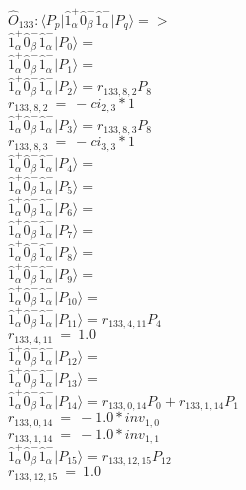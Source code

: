\documentclass[14pt]{article}
\begin{document}
    $\hat{O}_{133}:  \langle{P_p}\vert \hat{1}_{\alpha}^{+}\hat{0}_{\beta}^{-}\hat{1}_{\alpha}^{-} \vert{P_q}\rangle => $ \\ 
    $ \hat{1}_{\alpha}^{+}\hat{0}_{\beta}^{-}\hat{1}_{\alpha}^{-} \vert{P_{0}}\rangle =  $ \\ 
    $ \hat{1}_{\alpha}^{+}\hat{0}_{\beta}^{-}\hat{1}_{\alpha}^{-} \vert{P_{1}}\rangle =  $ \\ 
    $ \hat{1}_{\alpha}^{+}\hat{0}_{\beta}^{-}\hat{1}_{\alpha}^{-} \vert{P_{2}}\rangle = {r}_{133,8,2}P_{8} $ \\ 
    ${r}_{133,8,2}\ =\ -{ci}_{2,3}*1 $ \\ 
    $ \hat{1}_{\alpha}^{+}\hat{0}_{\beta}^{-}\hat{1}_{\alpha}^{-} \vert{P_{3}}\rangle = {r}_{133,8,3}P_{8} $ \\ 
    ${r}_{133,8,3}\ =\ -{ci}_{3,3}*1 $ \\ 
    $ \hat{1}_{\alpha}^{+}\hat{0}_{\beta}^{-}\hat{1}_{\alpha}^{-} \vert{P_{4}}\rangle =  $ \\ 
    $ \hat{1}_{\alpha}^{+}\hat{0}_{\beta}^{-}\hat{1}_{\alpha}^{-} \vert{P_{5}}\rangle =  $ \\ 
    $ \hat{1}_{\alpha}^{+}\hat{0}_{\beta}^{-}\hat{1}_{\alpha}^{-} \vert{P_{6}}\rangle =  $ \\ 
    $ \hat{1}_{\alpha}^{+}\hat{0}_{\beta}^{-}\hat{1}_{\alpha}^{-} \vert{P_{7}}\rangle =  $ \\ 
    $ \hat{1}_{\alpha}^{+}\hat{0}_{\beta}^{-}\hat{1}_{\alpha}^{-} \vert{P_{8}}\rangle =  $ \\ 
    $ \hat{1}_{\alpha}^{+}\hat{0}_{\beta}^{-}\hat{1}_{\alpha}^{-} \vert{P_{9}}\rangle =  $ \\ 
    $ \hat{1}_{\alpha}^{+}\hat{0}_{\beta}^{-}\hat{1}_{\alpha}^{-} \vert{P_{10}}\rangle =  $ \\ 
    $ \hat{1}_{\alpha}^{+}\hat{0}_{\beta}^{-}\hat{1}_{\alpha}^{-} \vert{P_{11}}\rangle = {r}_{133,4,11}P_{4} $ \\ 
    ${r}_{133,4,11}\ =\ 1.0 $ \\ 
    $ \hat{1}_{\alpha}^{+}\hat{0}_{\beta}^{-}\hat{1}_{\alpha}^{-} \vert{P_{12}}\rangle =  $ \\ 
    $ \hat{1}_{\alpha}^{+}\hat{0}_{\beta}^{-}\hat{1}_{\alpha}^{-} \vert{P_{13}}\rangle =  $ \\ 
    $ \hat{1}_{\alpha}^{+}\hat{0}_{\beta}^{-}\hat{1}_{\alpha}^{-} \vert{P_{14}}\rangle = {r}_{133,0,14}P_{0}+{r}_{133,1,14}P_{1} $ \\ 
    ${r}_{133,0,14}\ =\ -1.0*{inv}_{1,0} $ \\ 
    ${r}_{133,1,14}\ =\ -1.0*{inv}_{1,1} $ \\ 
    $ \hat{1}_{\alpha}^{+}\hat{0}_{\beta}^{-}\hat{1}_{\alpha}^{-} \vert{P_{15}}\rangle = {r}_{133,12,15}P_{12} $ \\ 
    ${r}_{133,12,15}\ =\ 1.0 $ \\ 
    
\end{document}
